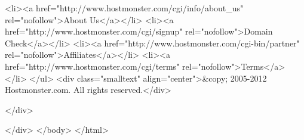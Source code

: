             <li><a href="http://www.hostmonster.com/cgi/info/about_us" rel="nofollow">About Us</a></li>
            <li><a href="http://www.hostmonster.com/cgi/signup" rel="nofollow">Domain Check</a></li>
            <li><a href="http://www.hostmonster.com/cgi-bin/partner" rel="nofollow">Affiliates</a></li>
            <li><a href="http://www.hostmonster.com/cgi/terms" rel="nofollow">Terms</a></li>
        </ul>
        <div class="smalltext" align="center">&copy; 2005-2012 Hostmonster.com. All rights reserved.</div>

    </div>

</div>
</body>
</html>
